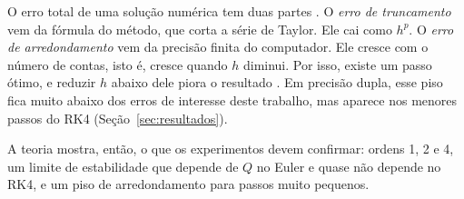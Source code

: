 O erro total de uma solução numérica tem duas partes \cite[seção~3.6]{aquino2020}. O \emph{erro de truncamento} vem da fórmula do método, que corta a série de Taylor. Ele cai como \(h^{p}\). O \emph{erro de arredondamento} vem da precisão finita do computador. Ele cresce com o número de contas, isto é, cresce quando \(h\) diminui. Por isso, existe um passo ótimo, e reduzir \(h\) abaixo dele piora o resultado \cite[seção~10.6]{aquino2020}. Em precisão dupla, esse piso fica muito abaixo dos erros de interesse deste trabalho, mas aparece nos menores passos do RK4 (Seção~\ref{sec:resultados}).

A teoria mostra, então, o que os experimentos devem confirmar: ordens 1, 2 e 4, um limite de estabilidade que depende de \(Q\) no Euler e quase não depende no RK4, e um piso de arredondamento para passos muito pequenos.
